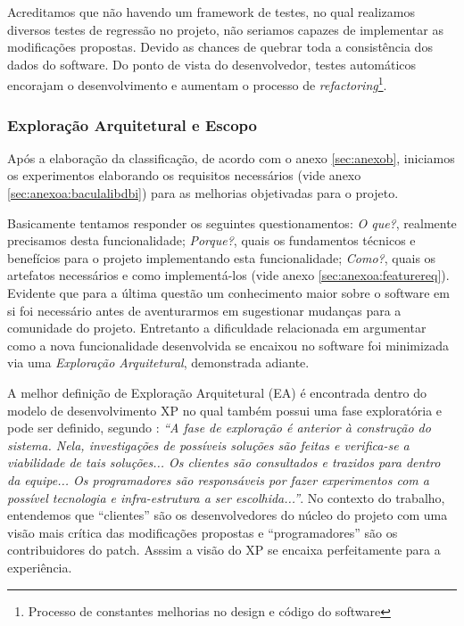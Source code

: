 Acreditamos que não havendo um framework de testes, no qual realizamos diversos testes de regressão no projeto, não seriamos capazes de implementar as modificações propostas. Devido as chances de quebrar toda a consistência dos dados do software. Do ponto de vista do desenvolvedor, testes automáticos encorajam o desenvolvimento e aumentam o processo de \textit{refactoring}\footnote{Processo de constantes melhorias no design e código do software}\cite[página 203]{producing}.

%  
%

\subsubsection{Exploração Arquitetural e Escopo}\label{subsec:arquiterual}\label{subsec:experiencia}

Após a elaboração da classificação, de acordo com o anexo \ref{sec:anexob}, iniciamos os experimentos elaborando os requisitos necessários (vide anexo \ref{sec:anexoa:baculalibdbi}) para as melhorias objetivadas para o projeto.

Basicamente tentamos responder os seguintes questionamentos: \textit{O que?}, realmente precisamos desta funcionalidade; \textit{Porque?}, quais os fundamentos técnicos e benefícios para o projeto implementando esta funcionalidade; \textit{Como?}, quais os artefatos necessários e como implementá-los (vide anexo \ref{sec:anexoa:featurereq}). Evidente que para a última questão um conhecimento maior sobre o software em si foi necessário antes de aventurarmos em sugestionar mudanças para a comunidade do projeto. Entretanto a dificuldade relacionada em argumentar como a nova funcionalidade desenvolvida se encaixou no software foi minimizada via uma \textit{Exploração Arquitetural}, demonstrada adiante.

A melhor definição de Exploração Arquitetural (EA) é encontrada dentro do modelo de desenvolvimento XP no qual também possui uma fase exploratória e pode ser definido, segundo \cite[página 36]{procdesenv}: \textit{``A fase de exploração é anterior à construção do sistema. Nela, investigações de possíveis soluções são feitas e verifica-se a viabilidade de tais soluções... Os clientes são consultados e trazidos para dentro da equipe... Os programadores são responsáveis por fazer experimentos com a possível tecnologia e infra-estrutura a ser escolhida...''}. No contexto do trabalho, entendemos que ``clientes'' são os desenvolvedores do núcleo do projeto com uma visão mais crítica das modificações propostas e ``programadores'' são os contribuidores do patch. Asssim a visão do XP se encaixa perfeitamente para a experiência.

